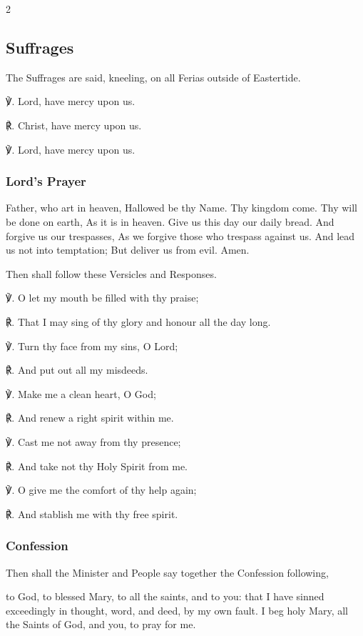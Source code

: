 \begin{multicols}{2}
\subsection{Suffrages}
\begin{rubric}
	The Suffrages are said, kneeling, on all Ferias outside of Eastertide.
\end{rubric}
℣. Lord, have mercy upon us.

℟. Christ, have mercy upon us.

℣. Lord, have mercy upon us.

\subsubsection{Lord's Prayer}
 Father, who art in heaven, Hallowed be thy Name. Thy kingdom come. Thy will be done on earth, As it is in heaven. Give us this day our daily bread. And forgive us our trespasses, As we forgive those who trespass against us. And lead us not into temptation; But deliver us from evil. Amen.

\begin{rubric}
	Then shall follow these Versicles and Responses.
\end{rubric}

℣. O let my mouth be filled with thy praise;

℟. That I may sing of thy glory and honour all the day long.

℣. Turn thy face from my sins, O Lord;

℟. And put out all my misdeeds.

℣. Make me a clean heart, O God;

℟. And renew a right spirit within me.

℣. Cast me not away from thy presence;

℟. And take not thy Holy Spirit from me.

℣. O give me the comfort of thy help again;

℟. And stablish me with thy free spirit.

\subsubsection{Confession}
\begin{rubric}
	Then shall the Minister and People say together the Confession following,
\end{rubric}
 to God, to blessed Mary, to all the saints, and to you: that I have sinned exceedingly in thought, word, and deed, by my own fault. I beg holy Mary, all the Saints of God, and you, to pray for me.


\end{multicols}
